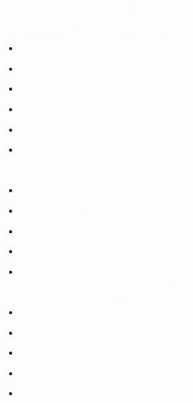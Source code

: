 \documentclass[aspectratio=169]{beamer}
\begin{document}
\begin{frame}
    \centering
    \Large

    \textcolor{white}{\LARGE{\textbf{Vote sur le prochain PPPPP}}}\\
    \vspace{24pt}

     {
        \textcolor{white}{
        \LARGE{\textbf{Deep-Dive sur les composantes Passives}}}\\

        \begin{itemize}
            \item \textcolor{white}{Types de condensateurs}
            \item \textcolor{white}{Derating de condensateurs}
            \item \textcolor{white}{Courbes d'impédance}
            \item \textcolor{white}{Saturation de bobines}
            \item \textcolor{white}{Normes et spécifications}
            \item \textcolor{white}{Comment choisir une composante}
        \end{itemize}
    }
     {
        \textcolor{white}{
        \LARGE{\textbf{Bonnes pratiques de Schéma \& Layout}}}\\

        \begin{itemize}
            \item \textcolor{white}{Quoi mettre sur un silkscreen}
            \item \textcolor{white}{Notes sur un schéma}
            \item \textcolor{white}{Protections de circuit}
            \item \textcolor{white}{Comment utiliser les couches mécaniques}
            \item \textcolor{white}{Comment bien faire un BOM}
        \end{itemize}
    }
     {
        \textcolor{white}{
        \LARGE{\textbf{Comment se déplace un signal sur un PCB}}}\\

        \begin{itemize}
            \item \textcolor{white}{Où l'impédance est la plus faible?}
            \item \textcolor{white}{Retour de courant}
            \item \textcolor{white}{Ground Bounce}
            \item \textcolor{white}{Vitesse de déplacement d'un signal}
            \item \textcolor{white}{Tout est une ligne de transmission}
        \end{itemize}
    }


\end{frame}
\end{document}
